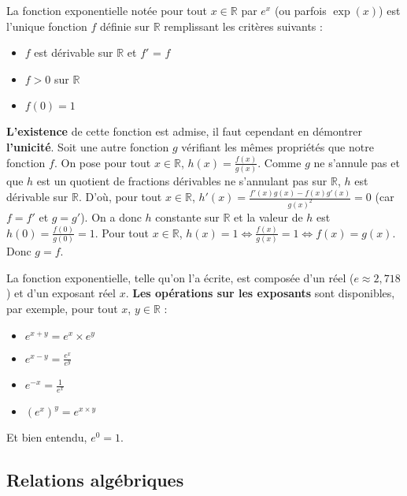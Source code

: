 	\begin{formula}[Définition]
		La fonction exponentielle notée pour tout $x \in \mathbb{R}$ par $e^x$ (ou parfois $\exp(x)$) est l'unique fonction $f$ définie sur $\mathbb{R}$ remplissant les critères suivants :
		\begin{itemize}
			\item $f$ est dérivable sur $\mathbb{R}$ et $f'$ = $f$
			\item $f > 0$ sur $\mathbb{R}$
			\item $f(0) = 1$
		\end{itemize}
	\end{formula}

	\begin{demonstration}[Existence]
		\textbf{L'existence} de cette fonction est admise, il faut cependant en démontrer \textbf{l'unicité}.
		\newpar
		Soit une autre fonction $g$ vérifiant les mêmes propriétés que notre fonction $f$. On pose pour tout $x \in \mathbb{R}$, $h(x) = \frac{f(x)}{g(x)}$.
		\newpar
		Comme $g$ ne s'annule pas et que $h$ est un quotient de fractions dérivables ne s'annulant pas sur $\mathbb{R}$, $h$ est dérivable sur $\mathbb{R}$.
		\newpar
		D'où, pour tout $x \in \mathbb{R}$, $h'(x) = \frac{f'(x)g(x) - f(x)g'(x)}{g(x)^2} = 0$ (car $f = f'$ et $g = g'$).
		\newpar
		On a donc $h$ constante sur $\mathbb{R}$ et la valeur de $h$ est $h(0) = \frac{f(0)}{g(0)} = 1$.
		\newpar
		Pour tout $x \in \mathbb{R}$, $h(x) = 1 \iff \frac{f(x)}{g(x)} = 1 \iff f(x) = g(x)$. Donc $g = f$.
	\end{demonstration}

	\begin{tip}[Formules]
		La fonction exponentielle, telle qu'on l'a écrite, est composée d'un réel ($e \approx 2,718 $) et d'un exposant réel $x$. \textbf{Les opérations sur les exposants} sont disponibles, par exemple, pour tout $x$, $y \in \mathbb{R}$ :
		\begin{itemize}
			\item $e^{x+y} = e^x \times e^y$
			\item $e^{x-y} = \frac{e^x}{e^y}$
			\item $e^{-x} = \frac{1}{e^x}$
			\item $(e^x)^y = e^{x \times y}$
		\end{itemize}
		Et bien entendu, $e^0 = 1$.
	\end{tip}

	\subsection{Relations algébriques}

